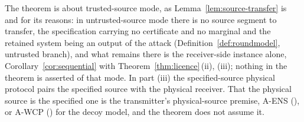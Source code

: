
The theorem is about trusted-source mode, as Lemma~\ref{lem:source-transfer}
is and for its reasons: in untrusted-source mode there is no source segment to
transfer, the specification carrying no certificate and no marginal and the
retained system being an output of the attack
(Definition~\ref{def:roundmodel}, untrusted branch), and what remains there is
the receiver-side instance alone, Corollary~\ref{cor:sequential} with
Theorem~\ref{thm:licence}\,(ii), (iii); nothing in the theorem is asserted of
that mode. In part (iii) the specified-source physical protocol pairs the
specified source with the physical receiver. That the physical source is the
specified one is the transmitter's physical-source premise, A-ENS (), or A-WCP
() for the decoy model, and the theorem does
not assume it.

